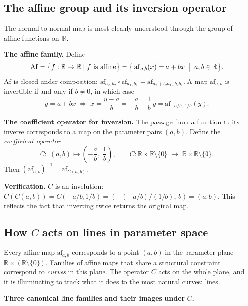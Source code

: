 \documentclass[11pt,a4paper]{article}
\newcommand{\R}{\mathbb{R}}
\begin{document}
\subsection{The affine group and its inversion operator}
\label{sec:affine-group}

The normal-to-normal map is most cleanly understood through the group of affine functions
on~$\R$.

\medskip\noindent\textbf{The affine family.}
Define
\[
  \mathrm{Af} = \bigl\{f:\R\to\R \mid f \text{ is affine}\bigr\}
             = \bigl\{\,\mathrm{af}_{a,b}(x) = a + bx \;\bigm|\; a,b\in\R\bigr\}.
\]
$\mathrm{Af}$ is closed under composition:
$\mathrm{af}_{a_2,b_2}\circ\mathrm{af}_{a_1,b_1}=\mathrm{af}_{a_2+b_2 a_1,\,b_2 b_1}$.
A map $\mathrm{af}_{a,b}$ is invertible if and only if $b\ne 0$, in which case
\[
  y = a + bx
  \;\Longrightarrow\;
  x = \frac{y-a}{b} = -\frac{a}{b} + \frac{1}{b}\,y
  = \mathrm{af}_{-a/b,\;1/b}(y).
\]

\medskip\noindent\textbf{The coefficient operator for inversion.}
The passage from a function to its inverse corresponds to a map on the parameter pairs
$(a,b)$.  Define the \emph{coefficient operator}
\[
  \boxed{C:\;(a,b)\mapsto\!\left(-\frac{a}{b},\;\frac{1}{b}\right)},
  \qquad
  C:\R\times\R\setminus\{0\}\;\longrightarrow\;\R\times\R\setminus\{0\}.
\]
Then $(\mathrm{af}_{a,b})^{-1}=\mathrm{af}_{C(a,b)}$.

\noindent\textbf{Verification.}  $C$ is an involution: $C(C(a,b))=C(-a/b,1/b)=
(-(-a/b)/(1/b),\,b)=(a,b)$.  This reflects the fact that inverting twice returns the
original map. \checkmark

\subsection{How $C$ acts on lines in parameter space}
\label{sec:C-geometry}

Every affine map $\mathrm{af}_{a,b}$ corresponds to a point $(a,b)$ in the parameter plane
$\R\times(\R\setminus\{0\})$.  Families of affine maps that share a structural
constraint correspond to \emph{curves} in this plane.  The operator $C$ acts on the whole
plane, and it is illuminating to track what it does to the most natural curves: lines.

\medskip\noindent\textbf{Three canonical line families and their images under $C$.}
\end{document}
